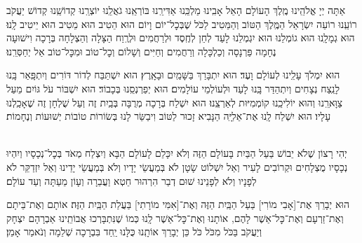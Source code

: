\documentclass[twoside, openany, parskip=half, 11pt]{book}
\begin{document}
אַתָּה יְיָ אֱלֹהֵֽינוּ מֶֽלֶךְ הָעוֹלָם הָאֵל אָבִֽינוּ מַלְכֵּֽנוּ אַדִּירֵֽנוּ בּוֹרְאֵֽנוּ גֹאֲלֵֽנוּ יוֹצְרֵֽנוּ קְדוֹשֵֽׁנוּ קְדוֹשׁ יַעֲקֹב רוֹעֵֽנוּ רוֹעֵה יִשְׂרָאֵל הַמֶּֽלֶךְ הַטּוֹב וְהַמֵּטִיב לַכֹּל שֶׁבְּכׇל־יוֹם וָיוֹם הוּא הֵטִיב הוּא מֵטִיב הוּא יֵיטִיב לָֽנוּ׃ הוּא גְמָלָֽנוּ הוּא גוֹמְלֵנוּ הוּא יִגְמְלֵנוּ לָעַד לְחֵן לְחֶֽסֶד וּלְרַחֲמִים וּלְרֶֽוַח הַצָּלָה וְהַצְלָחָה בְּרָכָה וִישׁוּעָה נֶחָמָה פַּרְנָסָה וְכַלְכָּלָה וְרַחֲמִים וְחַיִּים וְשָׁלוֹם וְכׇל־טוֹב וּמִכׇּל־טוֹב אַל יְחַסְּרֵֽנוּ׃

הוּא יִמְלֹךְ עָלֵֽינוּ לְעוֹלָם וָעֶד׃
הוּא יִתְבָּרַךְ בַּשָּׁמַֽיִם וּבָאָֽרֶץ׃
הוּא יִשְׁתַּבַּח לְדוֹר דּוֹרִים וְיִתְפָּֽאַר בָּֽנוּ לָנֵֽצַח נְצָחִים
וְיִתְהַדַּר בָּֽנוּ לָעַד וּלְעוֹלְמֵי עוֹלָמִים׃
הוּא יְפַרְנְסֵֽנוּ בְּכָבוֹד׃
הוּא יִשְׁבּוֹר עֹל גּוֹיִם מֵעַל צַוָּארֵֽנוּ וְהוּא יוֹלִיכֵֽנוּ קוֹמְמִיּוּת לְאַרְצֵֽנוּ׃
הוּא יִשְׁלַח בְּרָכָה מְרֻבָּה בְּבַֽיִת זֶה וְעַל שֻׁלְחָן זֶה שֶׁאָכַֽלְנוּ עָלָיו׃
הוּא יִשְׁלַח לָֽנוּ אֶת־אֵלִיָּֽה הַנָּבִיא זָכוּר לַטּוֹב וִיבַשֵּׂר לָנוּ בְּשׂוֹרוֹת טוֹבוֹת יְשׁוּעוֹת וְנֶחָמוֹת׃


\begin{footnotesize}
\\
יְהִי רָצוֹן שֶׁלֹא יֵבוֹשׁ בַּעַל הַבַּיִת בָּעוֹלָם הַזֶּה וְלֹא יִכָּלֵם לָעוֹלָם הַבָּא וְיִצְלַח מְאֹד בְּכׇל־נְכָסָיו וְיִהְיוּ נְכָסָיו מֻצְלָחִים וּקְרוֹבִים לָעִיר וְאַל יִשְׁלוֹט שָׂטָן לֹא בְּמַעֲשֵׂי יָדָיו וְלֹא בְּמַעֲשֵׂי יָדֵינוּ וְאַל יִזְדַקֵּר לֹא לְפָנָיו וְלֹא לְפָנֵינוּ שׁוּם דְבַר הִרְהוּר חֵטְא וַעֲבֵרָה וְעָוֹן מֵעַתָּה וְעַד עוֹלָם׃

\end{footnotesize}

הוּא יְבָרֵךְ אֶת־[אָבִי מוֹרִי] בַּעַל הַבַּֽיִת הַזֶּה וְאֶת־[אִמִּי מוֹרָתִי] בַּעֲלַת הַבַּֽיִת הַזֶּה׃ אוֹתָם וְאֶת־בֵּיתָם וְאֶת־זַרְעָם וְאֶת־כׇּל־אַשֶׁר לָהֶם, אוֹתָנוּ וְאֶת־כׇּל־אַשֶׁר לָֽנוּ כְּמוֹ שֶׁנִּתְבָּרְכוּ אֲבוֹתֵֽינוּ אַבְרָהָם יִצְחָק וְיַעֲקֹב בַּכֹּל מִכֹּל כֹּל כֵּן יְבָרֵךְ אוֹתָֽנוּ כֻּלָּנוּ יַֽחַד בִּבְרָכָה שְׁלֵמָה וְנֹאמַר אָמֵן׃
\end{document}
